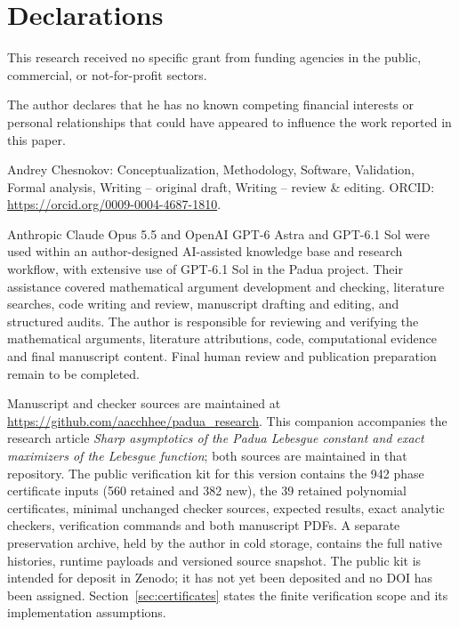 \documentclass[pdflatex,sn-mathphys-num]{sn-jnl}
\theoremstyle{thmstyleone}
\theoremstyle{thmstyletwo}
\begin{document}
\section*{Declarations}
This research received no specific grant from funding agencies in the
public, commercial, or not-for-profit sectors.

The author declares that he has no known competing financial interests or
personal relationships that could have appeared to influence the work
reported in this paper.

Andrey Chesnokov: Conceptualization, Methodology, Software, Validation,
Formal analysis, Writing -- original draft, Writing -- review \& editing.
ORCID: \url{https://orcid.org/0009-0004-4687-1810}.

Anthropic Claude Opus 5.5 and OpenAI GPT-6 Astra and GPT-6.1 Sol were used
within an
author-designed AI-assisted knowledge base and research workflow, with
extensive use of GPT-6.1 Sol in the Padua project. Their assistance covered
mathematical argument development and checking, literature searches,
code writing and review, manuscript drafting and editing, and structured
audits. The author is responsible for reviewing and verifying the
mathematical arguments, literature attributions, code, computational
evidence and final manuscript content. Final human review and publication
preparation remain to be completed.

Manuscript and checker sources are maintained at
\url{https://github.com/aacchhee/padua_research}.
This companion accompanies the research article \emph{Sharp asymptotics of the Padua Lebesgue constant and exact maximizers of the Lebesgue function}; both sources are maintained in that repository.
The public verification kit for this version contains the 942 phase
certificate inputs (560 retained and 382 new), the 39 retained polynomial
certificates, minimal unchanged checker sources, expected results, exact
analytic checkers, verification commands and both manuscript PDFs.
A separate preservation archive, held by the author in cold storage,
contains the full native histories, runtime payloads and versioned source
snapshot. The public kit is intended for deposit in Zenodo; it has not
yet been deposited and no DOI has been assigned.
Section~\ref{sec:certificates} states the finite verification scope and
its implementation assumptions.


\end{document}
